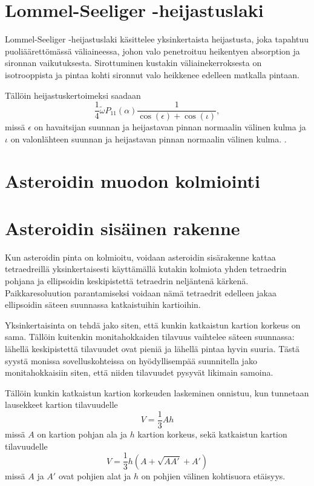 \documentclass[12pt,a4paper,titlepage]{article}
\begin{document}
\section{Lommel-Seeliger -heijastuslaki}
Lommel-Seeliger -heijastuslaki käsittelee yksinkertaista heijastusta, joka tapahtuu puoliäärettömässä väliaineessa, johon valo penetroituu heikentyen absorption ja sironnan vaikutuksesta. Sirottuminen kustakin väliainekerroksesta on isotrooppista ja pintaa kohti sironnut valo heikkenee edelleen matkalla pintaan. \cite{lommel}

Tällöin heijastuskertoimeksi saadaan
\begin{equation}
	\frac{1}{4}\widetilde{\omega}P_{11}(\alpha)\frac{1}{\cos(\epsilon)+\cos(\iota)},
\end{equation}
missä $\epsilon$ on havaitsijan suunnan ja heijastavan pinnan normaalin välinen kulma ja $\iota$ on valonlähteen suunnan ja heijastavan pinnan normaalin välinen kulma. \cite{tenttimatsku, lommel}.

\section{Asteroidin muodon kolmiointi}


\section{Asteroidin sisäinen rakenne}
Kun asteroidin pinta on kolmioitu, voidaan asteroidin sisärakenne kattaa tetraedreillä yksinkertaisesti käyttämällä kutakin kolmiota yhden tetraedrin pohjana ja ellipsoidin keskipistettä tetraedrin neljäntenä kärkenä. Paikkaresoluution parantamiseksi voidaan nämä tetraedrit edelleen jakaa ellipsoidin säteen suunnassa katkaistuihin kartioihin.

Yksinkertaisinta on tehdä jako siten, että kunkin katkaistun kartion korkeus on sama. Tällöin kuitenkin monitahokkaiden tilavuus vaihtelee säteen suunnassa: lähellä keskipistettä tilavuudet ovat pieniä ja lähellä pintaa hyvin suuria. Tästä syystä monissa sovelluskohteissa on hyödyllisempää suunnitella jako monitahokkaisiin siten, että niiden tilavuudet pysyvät likimain samoina.

Tällöin kunkin katkaistun kartion korkeuden laskeminen onnistuu, kun tunnetaan lausekkeet kartion tilavuudelle
\begin{equation}
	V=\frac{1}{3}Ah
\end{equation}
missä $A$ on kartion pohjan ala ja $h$ kartion korkeus, sekä katkaistun kartion tilavuudelle
\begin{equation}\label{katkaistukartio}
	 V = \frac{1}{3} h (A + \sqrt {AA'} + A')
\end{equation}
missä $A$ ja $A'$ ovat pohjien alat ja $h$ on pohjien välinen kohtisuora etäisyys. \cite{wiki:kartio}
\end{document}
